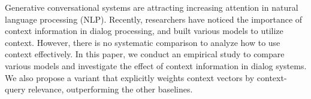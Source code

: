 Generative conversational systems are attracting increasing attention in natural language processing (NLP). Recently, researchers have noticed the importance of context information in dialog processing, and built various models to utilize context. However, there is no systematic comparison to analyze how to use context effectively. In this paper, we conduct an empirical study to compare various models and investigate the effect of context information in dialog systems. We also propose a variant that explicitly weights context vectors by context-query relevance, outperforming the other baselines.
